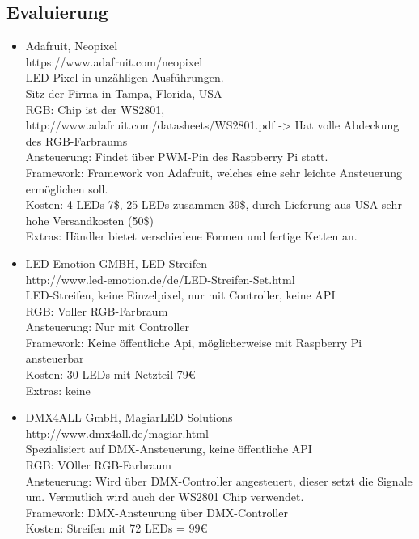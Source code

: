 \documentclass[12pt,a4paper]{scrreprt}
\begin{document}
\subsection{Evaluierung}
\begin{itemize}
\item Adafruit, Neopixel \\
https://www.adafruit.com/neopixel \\
LED-Pixel in unzähligen Ausführungen. \\
Sitz der Firma in Tampa, Florida, USA \\
RGB: Chip ist der WS2801, http://www.adafruit.com/datasheets/WS2801.pdf -> Hat volle Abdeckung des RGB-Farbraums \\
Ansteuerung: Findet über PWM-Pin des Raspberry Pi statt. \\
Framework: Framework von Adafruit, welches eine sehr leichte Ansteuerung ermöglichen soll. \\
Kosten: 4 LEDs  7\$, 25 LEDs zusammen  39\$, durch Lieferung aus USA sehr hohe Versandkosten (50\$) \\
Extras: Händler bietet verschiedene Formen und fertige Ketten an. \\
\item LED-Emotion GMBH, LED Streifen \\
http://www.led-emotion.de/de/LED-Streifen-Set.html \\
LED-Streifen, keine Einzelpixel, nur mit Controller, keine API \\
RGB: Voller RGB-Farbraum \\
Ansteuerung: Nur mit Controller  \\
Framework: Keine öffentliche Api, möglicherweise mit Raspberry Pi ansteuerbar  \\
Kosten: 30 LEDs mit Netzteil 79€   \\
Extras: keine
\item DMX4ALL GmbH, MagiarLED Solutions \\
http://www.dmx4all.de/magiar.html \\
Spezialisiert auf DMX-Ansteuerung, keine öffentliche API \\
RGB: VOller RGB-Farbraum \\
Ansteuerung: Wird über DMX-Controller angesteuert, dieser setzt die Signale um. Vermutlich wird auch der WS2801 Chip verwendet. \\
Framework: DMX-Ansteurung über DMX-Controller \\
Kosten: Streifen mit 72 LEDs = 99€ \\

\end{itemize}
\end{document}

